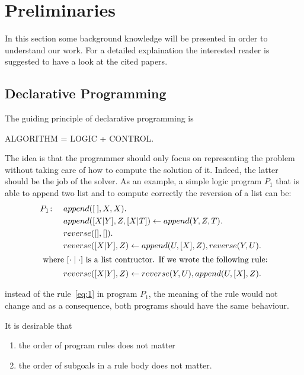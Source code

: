 \section{Preliminaries}
\label{sec:prelim}

In this section some background knowledge will be presented in order to understand our work. For a detailed explaination the interested reader is suggested to have a look at the cited papers. 

\subsection{Declarative Programming}
The guiding principle of declarative programming is
\begin{center} 
  ALGORITHM = LOGIC + CONTROL.
\end{center}
The idea is that the programmer should only focus on representing the problem without taking care of how to compute the solution of it. Indeed, the latter should be the job of the solver. As an example, a simple logic program \(P_1\) that  is able to append two list and to compute correctly the reversion of a list can be: 
\begin{align}
P_1 \colon \quad%
&append ([\:], X, X). \\
&append ([X|Y], Z, [X|T ]) \leftarrow append (Y, Z, T ). \\
&reverse([ ], [ ]).\\
&reverse([X|Y ], Z) \leftarrow append (U, [X], Z), reverse(Y, U ). \label{eq:1} \\
\intertext{
where \([\cdot\mid\cdot]\) is a list contructor.
If we wrote the following rule:}
&reverse([X|Y ], Z) \leftarrow reverse(Y, U ), append(U, [X], Z). \label{eq:2}
\end{align}

instead of the rule~\eqref{eq:1} in program \(P_1\), the meaning of the rule would not change and as a consequence, both programs should have the same behaviour. 

It is desirable that
\begin{enumerate}
\item the order of program rules does not matter
\item the order of subgoals in a rule body does not matter.
\end{enumerate}

